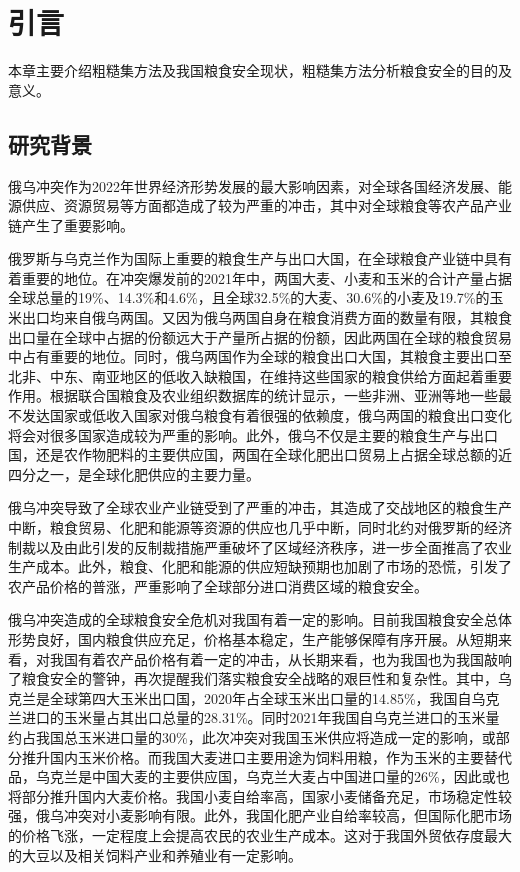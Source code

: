 
\chapter{引言}
本章主要介绍粗糙集方法及我国粮食安全现状，粗糙集方法分析粮食安全的目的及意义。

\section{研究背景}
俄乌冲突作为2022年世界经济形势发展的最大影响因素，对全球各国经济发展、能源供应、资源贸易等方面都造成了较为严重的冲击，其中对全球粮食等农产品产业链产生了重要影响。

俄罗斯与乌克兰作为国际上重要的粮食生产与出口大国，在全球粮食产业链中具有着重要的地位。在冲突爆发前的2021年中，两国大麦、小麦和玉米的合计产量占据全球总量的19\%、14.3\%和4.6\%，且全球32.5\%的大麦、30.6\%的小麦及19.7\%的玉米出口均来自俄乌两国\cite{俄乌冲突的蝴蝶效应与中国粮食安全的地缘风险}。又因为俄乌两国自身在粮食消费方面的数量有限，其粮食出口量在全球中占据的份额远大于产量所占据的份额，因此两国在全球的粮食贸易中占有重要的地位。同时，俄乌两国作为全球的粮食出口大国，其粮食主要出口至北非、中东、南亚地区的低收入缺粮国，在维持这些国家的粮食供给方面起着重要作用。根据联合国粮食及农业组织数据库的统计显示，一些非洲、亚洲等地一些最不发达国家或低收入国家对俄乌粮食有着很强的依赖度，俄乌两国的粮食出口变化将会对很多国家造成较为严重的影响\cite{乌克兰危机对全球粮食安全的影响与中国应对策略}。此外，俄乌不仅是主要的粮食生产与出口国，还是农作物肥料的主要供应国，两国在全球化肥出口贸易上占据全球总额的近四分之一，是全球化肥供应的主要力量\cite{俄乌冲突对全球和我国粮食安全短期影响及建议}。

俄乌冲突导致了全球农业产业链受到了严重的冲击，其造成了交战地区的粮食生产中断，粮食贸易、化肥和能源等资源的供应也几乎中断，同时北约对俄罗斯的经济制裁以及由此引发的反制裁措施严重破坏了区域经济秩序，进一步全面推高了农业生产成本。此外，粮食、化肥和能源的供应短缺预期也加剧了市场的恐慌，引发了农产品价格的普涨，严重影响了全球部分进口消费区域的粮食安全\cite{俄乌冲突对中国粮食安全的影响}。

俄乌冲突造成的全球粮食安全危机对我国有着一定的影响\cite{俄乌冲突对中国农产品供需直接影响分析,俄乌冲突对中国粮食安全的影响}。目前我国粮食安全总体形势良好，国内粮食供应充足，价格基本稳定，生产能够保障有序开展。从短期来看，对我国有着农产品价格有着一定的冲击，从长期来看，也为我国也为我国敲响了粮食安全的警钟，再次提醒我们落实粮食安全战略的艰巨性和复杂性。其中，乌克兰是全球第四大玉米出口国，2020年占全球玉米出口量的14.85\%，我国自乌克兰进口的玉米量占其出口总量的28.31\%。同时2021年我国自乌克兰进口的玉米量约占我国总玉米进口量的30\%，此次冲突对我国玉米供应将造成一定的影响，或部分推升国内玉米价格。而我国大麦进口主要用途为饲料用粮，作为玉米的主要替代品，乌克兰是中国大麦的主要供应国，乌克兰大麦占中国进口量的26\%，因此或也将部分推升国内大麦价格。我国小麦自给率高，国家小麦储备充足，市场稳定性较强，俄乌冲突对小麦影响有限。此外，我国化肥产业自给率较高，但国际化肥市场的价格飞涨，一定程度上会提高农民的农业生产成本。这对于我国外贸依存度最大的大豆以及相关饲料产业和养殖业有一定影响\cite{俄乌冲突对我国粮食安全的影响及其对策研究}。

